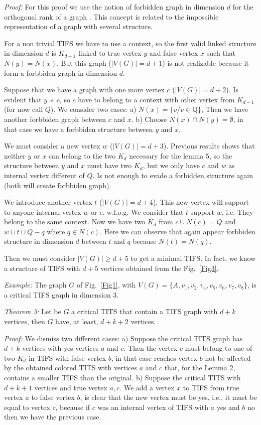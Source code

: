 \documentclass[%
  twocolumn,
 showpacs,
 showkeys,
 preprintnumbers,
 amsmath,amssymb,
 aps,
  pra,
  longbibliography,
 floatfix,
 ]{revtex4-1}
\def\endproof{ }
\begin{document}
{\em Proof:} For this proof we use the notion of forbidden graph in dimension $d$ for the orthogonal rank of a graph \cite{code21}. This concept is related to the impossible representation of a graph with several structure.

For a non trivial TIFS we have to use a context, so the first valid linked structure in dimension $d$ is $K_{d-1}$ linked to true vertex $y$ and false vertex $x$ such that $N(y) = N(x)$. But this graph ($|V(G)| = d+1$) is not realizable because it form a forbbiden graph in dimension $d$.

Suppose that we have a graph with one more vertex $c$ ($|V(G)| = d+2$). Is evident that $y \nsim c$, so $c$ have to belong to a context with other vertex from $K_{d-1}$ (for now call $Q$). We consider two cases: a) $N(x) = \{v / v \in $Q$\}$, Then we have another forbbiden graph between $c$ and $x$. b) Choose $N(x) \cap N(y) = \emptyset$, in that case we have a forbbiden structure between $y$ and $x$.

We must consider a new vertex $w$ ($|V(G)| = d+3$). Previous results shows that neither $y$ or $x$ can belong to the two $K_d$ necessary for the lemma 5, so the structure between $y$ and $x$ must have two $K_d$, but we only have $c$ and $w$ as internal vertex different of $Q$. Is not enough to evade a forbidden structure again (both will create forbbiden graph).

We introduce another vertex $t$ ($|V(G)| = d+4$). This new vertex will support to anyone internal vertex $w$ or $c$. w.l.o.g. We consider that $t$ support $w$, i.e. They belong to the same context. Now we have two $K_d$ from $c \cup N(c)=Q$ and $w \cup t \cup Q-{q}$ where $q \in N(c)$. Here we can observe that again appear forbbiden structure in dimension $d$ between $t$ and $q$ because $N(t) = N(q)$.

Then we must consider $|V(G)| \geq d+5$ to get a minimal TIFS. In fact, we know a structure of TIFS with $d+5$ vertices
obtained from the Fig.~\ref{Fig3}. \endproof

{\em Example:} The graph $G$ of Fig.~\ref{Fig1}, with $V(G) = \{A,v_1,v_2,v_4,v_5,v_6,v_7, v_8\}$, is a critical TIFS graph in dimension 3.

{\em Theorem 3:} Let be $G$ a critical TITS that contain a TIFS graph with $d+k$ vertices, then $G$ have, at least, $d+k+2$ vertices.

{\em Proof:} We dismiss two different cases: a) Suppose the critical TITS graph has $d+k$ vertices with yes vertices $a$ and $c$. Then the vertex $c$ must belong to one of two $K_d$ in TIFS with false vertex $b$, in that case reaches vertex $b$ not be affected by the obtained colored TITS with vertices $a$ and $c$ that, for the Lemma 2, contains a smaller TIFS than the original. b) Suppose the critical TITS with $d+k+1$ vertices and true vertex $a, c$. We add a vertex $x$ to TIFS from true vertex $a$ to false vertex $b$, is clear that the new vertex must be yes, i.e., it must be equal to vertex $c$, because if $c$ was an internal vertex of TIFS with $a$ yes and $b$ no then we have the previous case. \endproof
\end{document}

